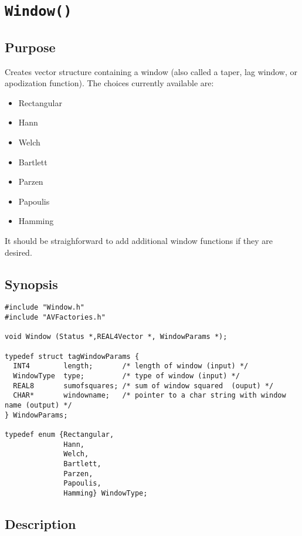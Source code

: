 \documentclass{article}
\begin{document}
\section{{\tt Window()}}

\subsection{Purpose}

Creates vector structure containing a window (also called
a taper, lag window, or apodization function).  The choices
currently available are:
\begin{itemize}
\item Rectangular
\item Hann
\item Welch
\item Bartlett
\item Parzen
\item Papoulis
\item Hamming
\end{itemize}
It should be straighforward to add additional window functions if
they are desired.

\subsection{Synopsis}


\begin{verbatim}
#include "Window.h"
#include "AVFactories.h"

void Window (Status *,REAL4Vector *, WindowParams *);

typedef struct tagWindowParams {
  INT4        length;       /* length of window (input) */
  WindowType  type;         /* type of window (input) */
  REAL8       sumofsquares; /* sum of window squared  (ouput) */
  CHAR*       windowname;   /* pointer to a char string with window name (output) */
} WindowParams;

typedef enum {Rectangular,
              Hann,
              Welch,
              Bartlett,
              Parzen,
              Papoulis,
              Hamming} WindowType;

\end{verbatim}
\subsection{Description}
\end{document}
